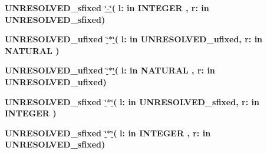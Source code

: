 \begin{DoxyCompactItemize}
\item 
{\bfseries {\bfseries \textcolor{vhdlchar}{U\+N\+R\+E\+S\+O\+L\+V\+E\+D\+\_\+sfixed}\textcolor{vhdlchar}{ }}} \hyperlink{class__fixed__pkg_ac2f01ba70fd51fb20393648e564e9cf8}{\char`\"{}-\/\char`\"{}}{\bfseries  ( }{\bfseries \textcolor{vhdlchar}{l\+: }\textcolor{stringliteral}{in }{\bfseries \textcolor{comment}{I\+N\+T\+E\+G\+E\+R}\textcolor{vhdlchar}{ }}}{\bfseries  , \textcolor{vhdlchar}{r\+: }\textcolor{stringliteral}{in }\textcolor{vhdlchar}{U\+N\+R\+E\+S\+O\+L\+V\+E\+D\+\_\+sfixed}}{\bfseries  )} 
\item 
{\bfseries {\bfseries \textcolor{vhdlchar}{U\+N\+R\+E\+S\+O\+L\+V\+E\+D\+\_\+ufixed}\textcolor{vhdlchar}{ }}} \hyperlink{class__fixed__pkg_a72ee02603ebb0ddcc88451a45e24e9e0}{\char`\"{}$\ast$\char`\"{}}{\bfseries  ( }{\bfseries \textcolor{vhdlchar}{l\+: }\textcolor{stringliteral}{in }\textcolor{vhdlchar}{U\+N\+R\+E\+S\+O\+L\+V\+E\+D\+\_\+ufixed}}{\bfseries  , \textcolor{vhdlchar}{r\+: }\textcolor{stringliteral}{in }{\bfseries \textcolor{comment}{N\+A\+T\+U\+R\+A\+L}\textcolor{vhdlchar}{ }}}{\bfseries  )} 
\item 
{\bfseries {\bfseries \textcolor{vhdlchar}{U\+N\+R\+E\+S\+O\+L\+V\+E\+D\+\_\+ufixed}\textcolor{vhdlchar}{ }}} \hyperlink{class__fixed__pkg_a72ee02603ebb0ddcc88451a45e24e9e0}{\char`\"{}$\ast$\char`\"{}}{\bfseries  ( }{\bfseries \textcolor{vhdlchar}{l\+: }\textcolor{stringliteral}{in }{\bfseries \textcolor{comment}{N\+A\+T\+U\+R\+A\+L}\textcolor{vhdlchar}{ }}}{\bfseries  , \textcolor{vhdlchar}{r\+: }\textcolor{stringliteral}{in }\textcolor{vhdlchar}{U\+N\+R\+E\+S\+O\+L\+V\+E\+D\+\_\+ufixed}}{\bfseries  )} 
\item 
{\bfseries {\bfseries \textcolor{vhdlchar}{U\+N\+R\+E\+S\+O\+L\+V\+E\+D\+\_\+sfixed}\textcolor{vhdlchar}{ }}} \hyperlink{class__fixed__pkg_adc75e260eb741edc3aae92fed900c09a}{\char`\"{}$\ast$\char`\"{}}{\bfseries  ( }{\bfseries \textcolor{vhdlchar}{l\+: }\textcolor{stringliteral}{in }\textcolor{vhdlchar}{U\+N\+R\+E\+S\+O\+L\+V\+E\+D\+\_\+sfixed}}{\bfseries  , \textcolor{vhdlchar}{r\+: }\textcolor{stringliteral}{in }{\bfseries \textcolor{comment}{I\+N\+T\+E\+G\+E\+R}\textcolor{vhdlchar}{ }}}{\bfseries  )} 
\item 
{\bfseries {\bfseries \textcolor{vhdlchar}{U\+N\+R\+E\+S\+O\+L\+V\+E\+D\+\_\+sfixed}\textcolor{vhdlchar}{ }}} \hyperlink{class__fixed__pkg_adc75e260eb741edc3aae92fed900c09a}{\char`\"{}$\ast$\char`\"{}}{\bfseries  ( }{\bfseries \textcolor{vhdlchar}{l\+: }\textcolor{stringliteral}{in }{\bfseries \textcolor{comment}{I\+N\+T\+E\+G\+E\+R}\textcolor{vhdlchar}{ }}}{\bfseries  , \textcolor{vhdlchar}{r\+: }\textcolor{stringliteral}{in }\textcolor{vhdlchar}{U\+N\+R\+E\+S\+O\+L\+V\+E\+D\+\_\+sfixed}}{\bfseries  )} 

\end{DoxyCompactItemize}
